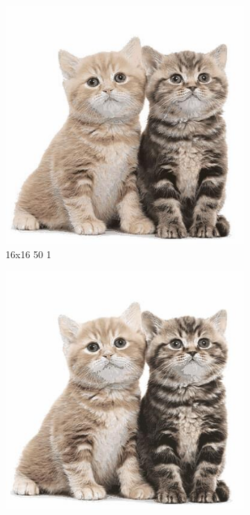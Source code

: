 \documentclass[12pt,a4paper]{article}
\begin{document}
\begin{figure}[htb]
\medskip
\begin{subfigure}{0.25\textwidth}
  \includegraphics[width=\linewidth]{images/big/16-16-50-1}
  \caption{16x16 50 1}
  \label{fig:4}
\end{subfigure}\hfil %
\begin{subfigure}{0.25\textwidth}
  \includegraphics[width=\linewidth]{images/big/16-16-100-05}

\end{subfigure}
\end{figure}
\end{document}
